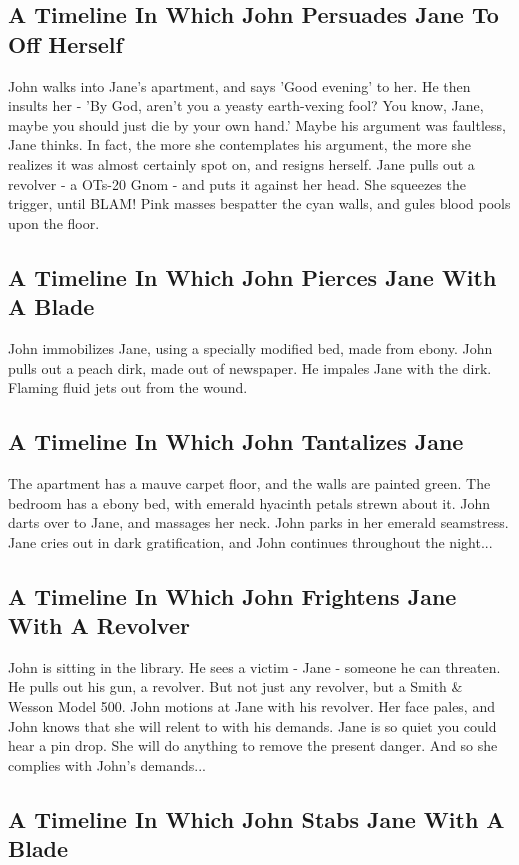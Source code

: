 \documentclass{article}
\begin{document}
\subsection{A Timeline In Which John Persuades Jane To Off Herself}


John walks into Jane's apartment, and says 'Good evening' to her.
He then insults her {-} 'By God, aren't you a yeasty earth{-}vexing fool?
You know, Jane, maybe you should just die by your own hand.'
Maybe his argument was faultless, Jane thinks.
In fact, the more she contemplates his argument, the more she realizes it was almost certainly spot on, and resigns herself.
Jane pulls out a revolver {-} a OTs{-}20 Gnom {-} and puts it against her head.
She squeezes the trigger, until BLAM!
Pink masses bespatter the cyan walls, and gules blood pools upon the floor.
\subsection{A Timeline In Which John Pierces Jane With A Blade}


John immobilizes Jane, using a specially modified bed, made from ebony.
John pulls out a peach dirk, made out of newspaper.
He impales Jane with the dirk.
Flaming fluid jets out from the wound.
\subsection{A Timeline In Which John Tantalizes Jane}


The apartment has a mauve carpet floor, and the walls are painted green.
The bedroom has a ebony bed, with emerald hyacinth petals strewn about it.
John darts over to Jane, and massages her neck.
John parks in her emerald seamstress.
Jane cries out in dark gratification, and John continues throughout the night...
\subsection{A Timeline In Which John Frightens Jane With A Revolver}


John is sitting in the library.
He sees a victim {-} Jane {-} someone he can threaten. He pulls out his gun, a revolver.
But not just any revolver, but a Smith \& Wesson Model 500.
John motions at Jane with his revolver. Her face pales, and John knows that she will relent to with his demands.
Jane is so quiet you could hear a pin drop. She will do anything to remove the present danger. And so she complies with John's demands...
\subsection{A Timeline In Which John Stabs Jane With A Blade}
\end{document}
